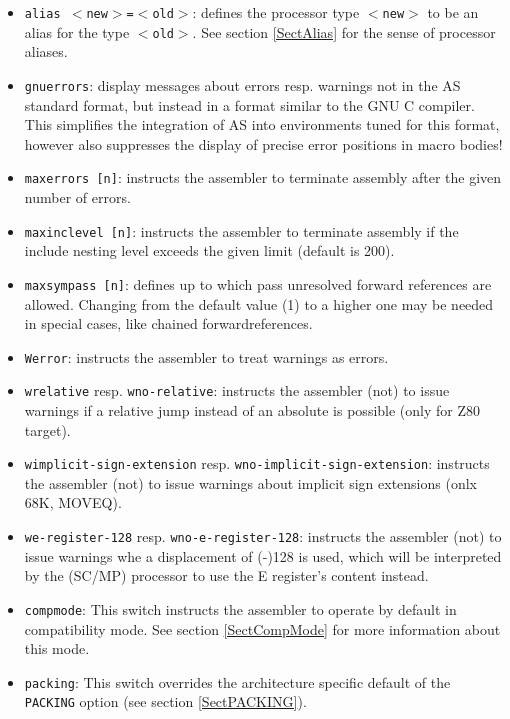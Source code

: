 \documentclass[12pt,twoside]{report}
\newcommand{\tty}[1]{{\tt #1}}
\newcommand{\asname}{{AS}}
\begin{document}
\begin{itemize}
{      \asname{} shall generate code for, in case the source file does not contain
      a {\tt CPU} instruction.  If the selected target
      supports CPU arguments (see section \ref{SectCPU}), they may be used
      on the command line as well.  Using this switch with \verb!?! or {\tt list}
      as argument lists all implemented targets.}
\item{\tty{alias $<$new$>$=$<$old$>$}:
      defines the processor type \tty{$<$new$>$} to be an alias for the
      type \tty{$<$old$>$}.  See section \ref{SectAlias} for the sense of
      processor aliases.}
\item{{\tt gnuerrors}: display messages about errors resp. warnings not
      in the \asname{} standard format, but instead in a format similar to the
      GNU C compiler.  This simplifies the integration of \asname{} into
      environments tuned for this format, however also suppresses the
      display of precise error positions in macro bodies!}
\item{{\tt maxerrors [n]}: instructs the assembler to terminate
      assembly after the given number of errors.}
\item{{\tt maxinclevel [n]}: instructs the assembler to terminate
      assembly if the include nesting level exceeds the given limit
      (default is 200).}
\item{{\tt maxsympass [n]}: defines up to which pass unresolved forward
      references are allowed.  Changing from the default value (1) to
      a higher one may be needed in special cases, like chained
      forwardreferences.}
\item{{\tt Werror}: instructs the assembler to treat warnings as errors.}
\item{{\tt wrelative} resp. {\tt wno-relative}: instructs the assembler
      (not) to issue warnings if a relative jump instead of an absolute is
      possible (only for Z80 target).}
\item{{\tt wimplicit-sign-extension} resp. {\tt wno-implicit-sign-extension}: instructs
      the assembler (not) to issue warnings about implicit sign extensions
      (onlx 68K, MOVEQ).}
\item{{\tt we-register-128} resp. {\tt wno-e-register-128}: instructs the assembler (not) to
      issue warnings whe a displacement of (-)128 is used, which will be
      interpreted by the (SC/MP) processor to use the E register's content
      instead.}
\item{\tty{compmode}: This switch instructs the assembler to operate by
      default in compatibility mode.  See section \ref{SectCompMode} for
      more information about this mode.}
\item{\tty{packing}: This switch overrides the architecture specific
      default of the {\tt PACKING} option (see section \ref{SectPACKING}).}
\end{itemize}
\end{document}
